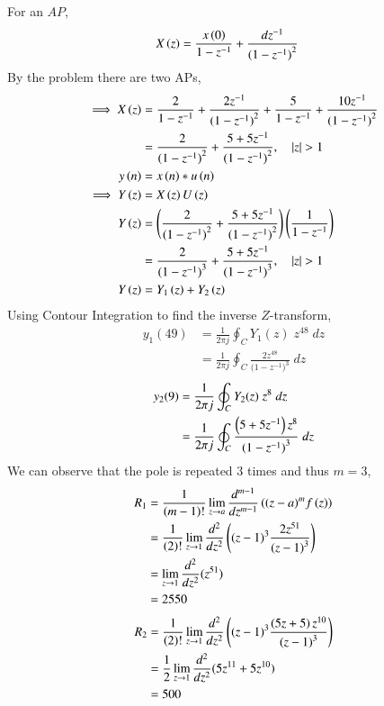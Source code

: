 \documentclass[journal,12pt,twocolumn]{IEEEtran}
\begin{document}
	For an $AP$,
	\begin{align}
		X\left(z\right) &= \frac{ x\left(0\right) }{1-z^{-1}} + \frac{dz^{-1}}{{(1-z^{-1})}^{2}} 
    \end{align}
    By the problem there are two APs,
    \begin{align}
		\implies X\left(z\right) &= \frac{2}{1-z^{-1}} + \frac{2z^{-1}}{{(1-z^{-1})}^{2}}
		+ \frac{5}{1-z^{-1}} + \frac{10z^{-1}}{{(1-z^{-1})}^{2}} \\
		&= \frac{2}{({1-z^{-1})}^{2}} + \frac{5+5z^{-1}}{({1-z^{-1})}^{2}}, \quad \left\vert z\right\vert>1 \\
		y\left(n\right)&=x\left(n\right)\ast u\left(n\right) \\
		\implies Y\left(z\right)&=X\left(z\right)U\left(z\right) \\
		Y\left(z\right)&=\left(\frac{2}{({1-z^{-1})}^{2}} + \frac{5+5z^{-1}}{({1-z^{-1})}^{2}}\right)\left(\frac{1}{1-z^{-1}}\right)\\
		&= \frac{2}{({1-z^{-1})}^{3}} + \frac{5+5z^{-1}}{({1-z^{-1})}^{3}},  \quad \left\vert z\right\vert>1\\
		Y\left(z\right)&= Y_1\left(z\right) + Y_2\left(z\right) 
	\end{align}
	Using Contour Integration to find the inverse $Z$-transform,
	\begin{align}
		y_1(49)&=\frac{1}{2\pi j}\oint_{C}Y_1(z) \;z^{48} \;dz  \\
		&=\frac{1}{2\pi j}\oint_{C}\frac{2z^{48}}{({1-z^{-1})}^{3}} \;dz 
	\end{align}
	\begin{align}
		y_2(9)&=\frac{1}{2\pi j}\oint_{C}Y_2(z) \;z^{8} \;dz  \\
		&=\frac{1}{2\pi j}\oint_{C}\frac{\left(5+5z^{-1}\right)z^{8}}{({1-z^{-1})}^{3}} \;dz 
	\end{align}
	We can observe that the pole is repeated $3$ times and thus $m=3$,
	\begin{align}
		R_1&=\frac{1}{\left(m-1\right)!}\lim\limits_{z\to a}\frac{d^{m-1}}{dz^{m-1}}\left({(z-a)}^{m}f\left(z\right)\right)  \\
		&=\frac{1}{\left(2\right)!}\lim\limits_{z\to 1}\frac{d^{2}}{dz^{2}}\left({(z-1)}^{3}\frac{2z^{51}}{{(z-1)}^3}\right)   \\
		&=\lim\limits_{z\to 1}\frac{d^2}{dz^2}(z^{51})   \\
		&=2550
	\end{align}
	\begin{align}
		R_2&=\frac{1}{\left(2\right)!}\lim\limits_{z\to 1}\frac{d^{2}}{dz^{2}}\left({(z-1)}^{3}\frac{\left(5z+5\right)z^{10}}{{(z-1)}^3}\right)   \\
		&=\frac{1}{{2}}\lim\limits_{z\to 1}\frac{d^2}{dz^2}(5z^{11}+5z^{10})   \\
		&=500
	\end{align}
\end{document}

